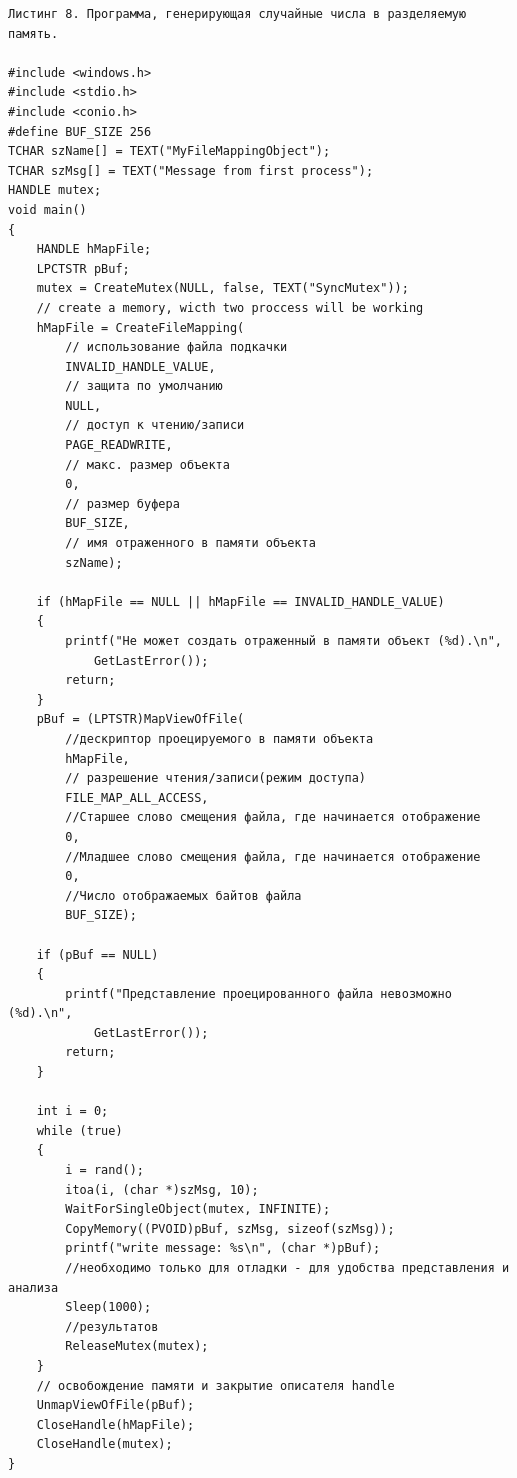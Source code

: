 \documentclass[a4paper,12pt]{article} %
\begin{document}
\begin{verbatim}
Листинг 8. Программа, генерирующая случайные числа в разделяемую память.

#include <windows.h>
#include <stdio.h>
#include <conio.h>
#define BUF_SIZE 256
TCHAR szName[] = TEXT("MyFileMappingObject");
TCHAR szMsg[] = TEXT("Message from first process");
HANDLE mutex;
void main()
{
    HANDLE hMapFile;
    LPCTSTR pBuf;
    mutex = CreateMutex(NULL, false, TEXT("SyncMutex"));
    // create a memory, wicth two proccess will be working
    hMapFile = CreateFileMapping(
        // использование файла подкачки
        INVALID_HANDLE_VALUE,
        // защита по умолчанию
        NULL,
        // доступ к чтению/записи
        PAGE_READWRITE,
        // макс. размер объекта
        0,
        // размер буфера
        BUF_SIZE,
        // имя отраженного в памяти объекта
        szName);

    if (hMapFile == NULL || hMapFile == INVALID_HANDLE_VALUE)
    {
        printf("Не может создать отраженный в памяти объект (%d).\n",
            GetLastError());
        return;
    }
    pBuf = (LPTSTR)MapViewOfFile(
        //дескриптор проецируемого в памяти объекта
        hMapFile,
        // разрешение чтения/записи(режим доступа)
        FILE_MAP_ALL_ACCESS,
        //Старшее слово смещения файла, где начинается отображение
        0,
        //Младшее слово смещения файла, где начинается отображение
        0,
        //Число отображаемых байтов файла
        BUF_SIZE);
    
    if (pBuf == NULL)
    {
        printf("Представление проецированного файла невозможно (%d).\n",
            GetLastError());
        return;
    }

    int i = 0;
    while (true)
    {
        i = rand();
        itoa(i, (char *)szMsg, 10);
        WaitForSingleObject(mutex, INFINITE);
        CopyMemory((PVOID)pBuf, szMsg, sizeof(szMsg));
        printf("write message: %s\n", (char *)pBuf);
        //необходимо только для отладки - для удобства представления и анализа
        Sleep(1000);
        //результатов
        ReleaseMutex(mutex);
    }
    // освобождение памяти и закрытие описателя handle
    UnmapViewOfFile(pBuf);
    CloseHandle(hMapFile);
    CloseHandle(mutex);
}
\end{verbatim}

\vspace{3em}
\end{document}
